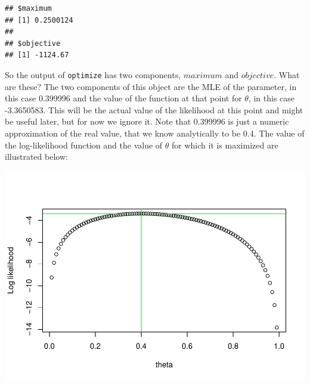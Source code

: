\documentclass[
]{book}
\newenvironment{Shaded}{\begin{snugshade}}{\end{snugshade}}
\newcommand{\AttributeTok}[1]{\textcolor[rgb]{0.13,0.29,0.53}{#1}}
\newcommand{\CommentTok}[1]{\textcolor[rgb]{0.56,0.35,0.01}{\textit{#1}}}
\newcommand{\ControlFlowTok}[1]{\textcolor[rgb]{0.13,0.29,0.53}{\textbf{#1}}}
\newcommand{\DecValTok}[1]{\textcolor[rgb]{0.00,0.00,0.81}{#1}}
\newcommand{\FloatTok}[1]{\textcolor[rgb]{0.00,0.00,0.81}{#1}}
\newcommand{\FunctionTok}[1]{\textcolor[rgb]{0.13,0.29,0.53}{\textbf{#1}}}
\newcommand{\NormalTok}[1]{#1}
\newcommand{\OtherTok}[1]{\textcolor[rgb]{0.56,0.35,0.01}{#1}}
\newcommand{\SpecialCharTok}[1]{\textcolor[rgb]{0.81,0.36,0.00}{\textbf{#1}}}
\newcommand{\StringTok}[1]{\textcolor[rgb]{0.31,0.60,0.02}{#1}}
\begin{document}
\begin{verbatim}
## $maximum
## [1] 0.2500124
## 
## $objective
## [1] -1124.67
\end{verbatim}

So the output of \texttt{optimize} has two components, \(maximum\) and \(objective\). What are these?
The two components of this object are the MLE of the parameter, in this case 0.399996 and the value of the function at that point for \(\theta\), in this case -3.3650583. This will be the actual value of the likelihood at this point and might be useful later, but for now we ignore it. Note that 0.399996 is just a numeric approximation of the real value, that we know analytically to be 0.4. The value of the log-likelihood function and the value of \(\theta\) for which it is maximized are illustrated below:

\begin{Shaded}
\end{Shaded}

\includegraphics{ECOMODbook_files/figure-latex/ch13.16-1.pdf}
\end{document}
